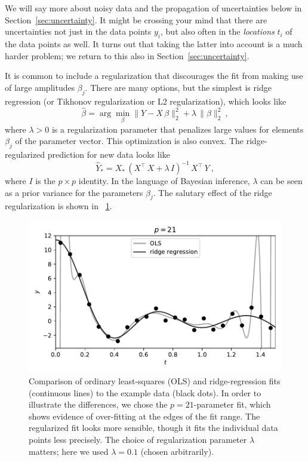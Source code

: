 \documentclass[12pt,letterpaper]{article}
\newlength{\figurewidth}
\newcommand{\sectionname}{Section}
\begin{document}
We will say more about noisy data and the propagation of uncertainties below in \sectionname~\ref{sec:uncertainty}.
It might be crossing your mind that there are uncertainties not just in the data points $y_i$, but also often in the \emph{locations} $t_i$ of the data points as well. It turns out that taking the latter into account is a much harder problem; we return to this also in \sectionname~\ref{sec:uncertainty}.

It is common to include a regularization that discourages the fit from making use of large amplitudes $\beta_j$.
There are many options, but the simplest is ridge regression (or Tikhonov regularization or L2 regularization), which looks like
\begin{equation}
    \hat{\beta} = \arg\min_\beta \|Y - X\,\beta\|_2^2 + \lambda\,\|\beta\|_2^2
    ~,
\end{equation}
where $\lambda>0$ is a regularization parameter that penalizes large values for elements $\beta_j$ of the parameter vector.
This optimization is also convex.
The ridge-regularized prediction for new data looks like
\begin{equation}
    \hat{Y}_\ast = X_\ast\,(X^\top\,X + \lambda\,I)^{-1}\,X^\top\,Y
    ~,
\end{equation}
where $I$ is the $p\times p$ identity.
In the language of Bayesian inference, $\lambda$ can be seen as a prior variance for the parameters $\beta_j$.
The salutary effect of the ridge regularization is shown in \figurename~\ref{fig:ridge}.
\begin{figure}[t]
    \begin{mdframed}
    \includegraphics[width=\figurewidth]{paper/ridge.pdf}
    \caption{Comparison of ordinary least-squares (OLS) and ridge-regression fits (continuous lines) to the example data (black dots). In order to illustrate the differences, we chose the $p=21$-parameter fit, which shows evidence of over-fitting at the edges of the fit range. The regularized fit looks more sensible, though it fits the individual data points less precisely. The choice of regularization parameter $\lambda$ matters; here we used $\lambda=0.1$ (chosen arbitrarily).}
    \label{fig:ridge}
    \end{mdframed}
\end{figure}
\end{document}
